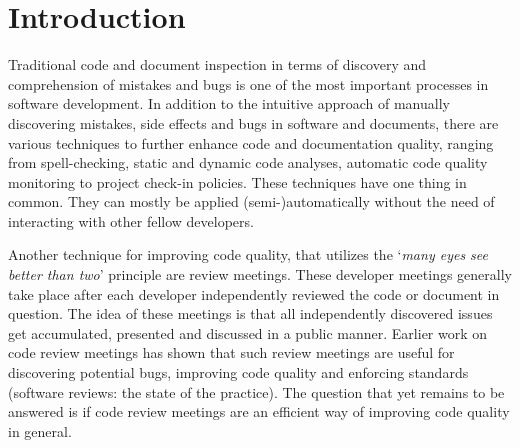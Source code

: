 \section{Introduction}
Traditional code and document inspection in terms of discovery and comprehension of mistakes and bugs is one of the most important processes in software development.
In addition to the intuitive approach of manually discovering mistakes, side effects and bugs in software and documents, there are various techniques to further enhance code and documentation quality, ranging from spell-checking, static and dynamic code analyses, automatic code quality monitoring to project check-in policies.
These techniques have one thing in common. They can mostly be applied (semi-)automatically without the need of interacting with other fellow developers.

Another technique for improving code quality, that utilizes the ‘\textit{many eyes see better than two}’ principle are review meetings.
These developer meetings generally take place after each developer independently reviewed the code or document in question.
The idea of these meetings is that all independently discovered issues get accumulated, presented and discussed in a public manner. 
Earlier work on code review meetings has shown that such review meetings are useful for discovering potential bugs, improving code quality and enforcing standards (software reviews: the state of the practice).
The question that yet remains to be answered is if code review meetings are an efficient way of improving code quality in general.